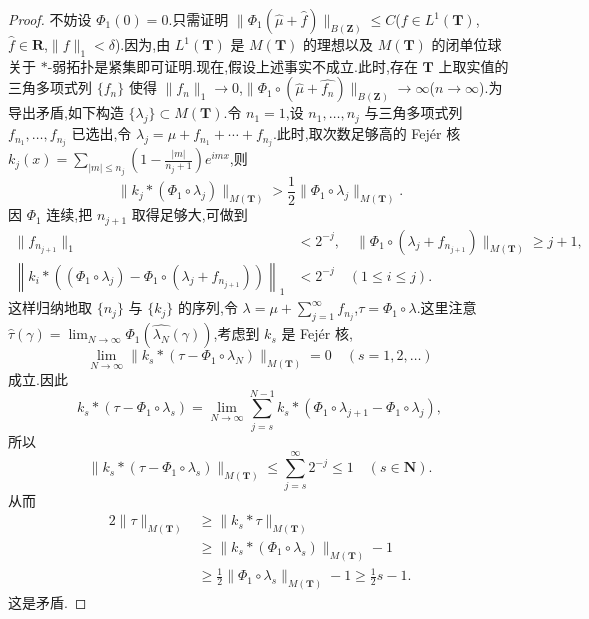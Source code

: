 \begin{proof}
不妨设 $\Phi_{1}(0) = 0$.只需证明 $\|\Phi_{1}(\widehat{\mu} + \widehat{f})\|_{B(\mathbf{Z})} \leq C$($f \in L^{1}(\mathbf{T})$,$\widehat{f} \in \mathbf{R}$,$\|f\|_{1} < \delta$).因为,由 $L^{1}(\mathbf{T})$ 是 $M(\mathbf{T})$ 的理想以及 $M(\mathbf{T})$ 的闭单位球关于 $*$-弱拓扑是紧集即可证明.现在,假设上述事实不成立.此时,存在 $\mathbf{T}$ 上取实值的三角多项式列 $\{f_{n}\}$ 使得 $\|f_{n}\|_{1} \to 0$,$\|\Phi_{1} \circ (\widehat{\mu} + \widehat{f_{n}})\|_{B(\mathbf{Z})} \to \infty$($n \to \infty$).为导出矛盾,如下构造 $\{\lambda_{j}\} \subset M(\mathbf{T})$.令 $n_{1} = 1$,设 $n_{1}, \ldots, n_{j}$ 与三角多项式列 $f_{n_{1}}, \ldots, f_{n_{j}}$ 已选出,令 $\lambda_{j} = \mu + f_{n_{1}} + \cdots + f_{n_{j}}$.此时,取次数足够高的 Fejér 核 $k_{j}(x) = \sum_{|m| \leq n_{j}}\left(1 - \frac{|m|}{n_{j} + 1}\right)e^{imx}$,则
\begin{equation*}
\|k_{j} * (\Phi_{1} \circ \lambda_{j})\|_{M(\mathbf{T})} > \frac{1}{2}\|\Phi_{1} \circ \lambda_{j}\|_{M(\mathbf{T})}.
\end{equation*}
因 $\Phi_{1}$ 连续,把 $n_{j+1}$ 取得足够大,可做到
\begin{align*}
\|f_{n_{j+1}}\|_{1} &< 2^{-j}, \quad \|\Phi_{1} \circ (\lambda_{j} + f_{n_{j+1}})\|_{M(\mathbf{T})} \geq j + 1,\\
\left\|k_{i} * \left((\Phi_{1} \circ \lambda_{j}) - \Phi_{1} \circ (\lambda_{j} + f_{n_{j+1}})\right)\right\|_{1} &< 2^{-j} \quad (1 \leq i \leq j).
\end{align*}
这样归纳地取 $\{n_{j}\}$ 与 $\{k_{j}\}$ 的序列,令 $\lambda = \mu + \sum_{j=1}^{\infty}f_{n_{j}}$,$\tau = \Phi_{1} \circ \lambda$.这里注意 $\widehat{\tau}(\gamma) = \lim_{N \to \infty}\Phi_{1}(\widehat{\lambda_{N}}(\gamma))$,考虑到 $k_{s}$ 是 Fejér 核,
\begin{equation*}
\lim_{N \to \infty}\|k_{s} * (\tau - \Phi_{1} \circ \lambda_{N})\|_{M(\mathbf{T})} = 0 \quad (s = 1, 2, \ldots)
\end{equation*}
成立.因此
\begin{equation*}
k_{s} * (\tau - \Phi_{1} \circ \lambda_{s}) = \lim_{N \to \infty}\sum_{j=s}^{N-1}k_{s} * (\Phi_{1} \circ \lambda_{j+1} - \Phi_{1} \circ \lambda_{j}),
\end{equation*}
所以
\begin{equation*}
\|k_{s} * (\tau - \Phi_{1} \circ \lambda_{s})\|_{M(\mathbf{T})} \leq \sum_{j=s}^{\infty}2^{-j} \leq 1 \quad (s \in \mathbf{N}).
\end{equation*}
从而
\begin{align*}
2\|\tau\|_{M(\mathbf{T})} &\geq \|k_{s} * \tau\|_{M(\mathbf{T})}\\
&\geq \|k_{s} * (\Phi_{1} \circ \lambda_{s})\|_{M(\mathbf{T})} - 1\\
&\geq \frac{1}{2}\|\Phi_{1} \circ \lambda_{s}\|_{M(\mathbf{T})} - 1 \geq \frac{1}{2}s - 1.
\end{align*}
这是矛盾.
\end{proof}

